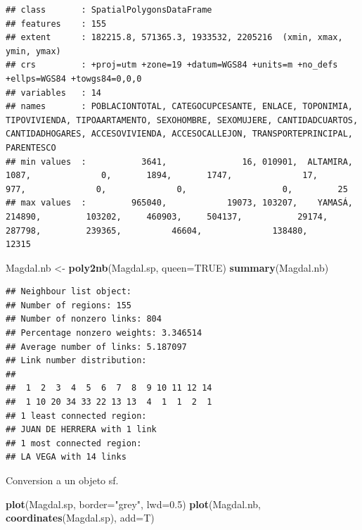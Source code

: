 \documentclass[11pt,]{article}
\newenvironment{Shaded}{\begin{snugshade}}{\end{snugshade}}
\newcommand{\KeywordTok}[1]{\textcolor[rgb]{0.13,0.29,0.53}{\textbf{#1}}}
\newcommand{\DataTypeTok}[1]{\textcolor[rgb]{0.13,0.29,0.53}{#1}}
\newcommand{\FloatTok}[1]{\textcolor[rgb]{0.00,0.00,0.81}{#1}}
\newcommand{\StringTok}[1]{\textcolor[rgb]{0.31,0.60,0.02}{#1}}
\newcommand{\OtherTok}[1]{\textcolor[rgb]{0.56,0.35,0.01}{#1}}
\newcommand{\NormalTok}[1]{#1}
\begin{document}
\begin{verbatim}
## class       : SpatialPolygonsDataFrame 
## features    : 155 
## extent      : 182215.8, 571365.3, 1933532, 2205216  (xmin, xmax, ymin, ymax)
## crs         : +proj=utm +zone=19 +datum=WGS84 +units=m +no_defs +ellps=WGS84 +towgs84=0,0,0 
## variables   : 14
## names       : POBLACIONTOTAL, CATEGOCUPCESANTE, ENLACE, TOPONIMIA, TIPOVIVIENDA, TIPOAARTAMENTO, SEXOHOMBRE, SEXOMUJERE, CANTIDADCUARTOS, CANTIDADHOGARES, ACCESOVIVIENDA, ACCESOCALLEJON, TRANSPORTEPRINCIPAL, PARENTESCO 
## min values  :           3641,               16, 010901,  ALTAMIRA,         1087,              0,       1894,       1747,              17,             977,              0,              0,                   0,         25 
## max values  :         965040,            19073, 103207,    YAMASÁ,       214890,         103202,     460903,     504137,           29174,          287798,         239365,          46604,              138480,      12315
\end{verbatim}

\begin{Shaded}
\begin{Highlighting}[]
\NormalTok{Magdal.nb <-}\StringTok{ }\KeywordTok{poly2nb}\NormalTok{(Magdal.sp, }\DataTypeTok{queen=}\OtherTok{TRUE}\NormalTok{)}
\KeywordTok{summary}\NormalTok{(Magdal.nb)}
\end{Highlighting}
\end{Shaded}

\begin{verbatim}
## Neighbour list object:
## Number of regions: 155 
## Number of nonzero links: 804 
## Percentage nonzero weights: 3.346514 
## Average number of links: 5.187097 
## Link number distribution:
## 
##  1  2  3  4  5  6  7  8  9 10 11 12 14 
##  1 10 20 34 33 22 13 13  4  1  1  2  1 
## 1 least connected region:
## JUAN DE HERRERA with 1 link
## 1 most connected region:
## LA VEGA with 14 links
\end{verbatim}

Conversion a un objeto sf.

\begin{Shaded}
\begin{Highlighting}[]
\KeywordTok{plot}\NormalTok{(Magdal.sp, }\DataTypeTok{border=}\StringTok{"grey"}\NormalTok{, }\DataTypeTok{lwd=}\FloatTok{0.5}\NormalTok{)}
\KeywordTok{plot}\NormalTok{(Magdal.nb, }\KeywordTok{coordinates}\NormalTok{(Magdal.sp), }\DataTypeTok{add=}\NormalTok{T)}
\end{Highlighting}
\end{Shaded}
\end{document}
